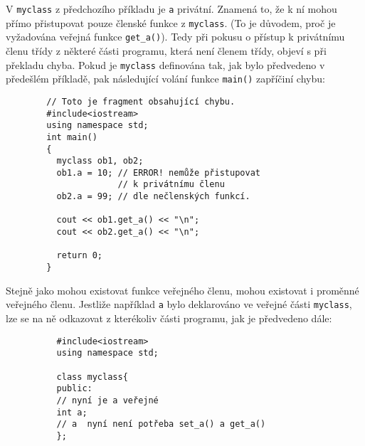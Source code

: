 {      \begin{example}
        V \lstinline[basicstyle=\ttfamily]!myclass! z předchozího příkladu je 
        \lstinline[basicstyle=\ttfamily]!a! privátní. Znamená to, že k ní mohou přímo přistupovat 
        pouze členské funkce z \lstinline[basicstyle=\ttfamily]!myclass!. (To je důvodem, proč je 
        vyžadována veřejná funkce \lstinline[basicstyle=\ttfamily]!get_a()!). Tedy při pokusu o 
        přístup k privátnímu členu třídy z některé části programu, která není členem třídy, objeví 
        s při překladu chyba. Pokud je \lstinline[basicstyle=\ttfamily]!myclass! definována tak, 
        jak bylo předvedeno v předešlém příkladě, pak následující volání funkce 
        \lstinline[basicstyle=\ttfamily]!main()! zapříčiní chybu:
  
        \begin{lstlisting}
        // Toto je fragment obsahující chybu.
        #include<iostream>
        using namespace std;
        int main()
        {
          myclass ob1, ob2;
          ob1.a = 10; // ERROR! nemůže přistupovat
                      // k privátnímu členu
          ob2.a = 99; // dle nečlenských funkcí.
  
          cout << ob1.get_a() << "\n";
          cout << ob2.get_a() << "\n";
  
          return 0;
        }
       \end{lstlisting}
      \end{example}
  
      \begin{example}
        Stejně jako mohou existovat funkce veřejného členu, mohou existovat i proměnné veřejného 
        členu. Jestliže například \lstinline[basicstyle=\ttfamily]!a! bylo deklarováno ve veřejné 
        části \lstinline[basicstyle=\ttfamily]!myclass!, lze se na ně odkazovat z kterékoliv části 
        programu, jak je předvedeno dále:
          \begin{lstlisting}
          #include<iostream>
          using namespace std;
  
          class myclass{
          public:
          // nyní je a veřejné
          int a;
          // a  nyní není potřeba set_a() a get_a()
          };
  

\end{lstlisting}
\end{example}}
